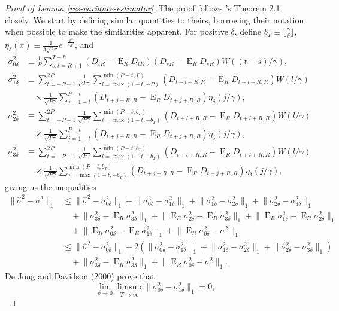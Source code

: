 \documentclass[11pt]{article}
\DeclareMathOperator{\E}{E}
\newcommand{\citepos}[1]{\citeauthor{#1}'s \citeyearpar{#1}}
\newcommand{\oosSum}[2]{\ensuremath{\sum_{#1=R+#2}^{T-\h}}}
\newcommand{\h}{h}
\newcommand{\vWeight}{W((t-s)/\gamma)}
\newcommand{\vSummand}{\ensuremath{(D_{tR} - \E_R D_{tR})(D_{sR} - \E_R D_{sR}) \vWeight}}
\newcommand{\kernelBDefn}[1]{\ensuremath{\frac1{\delta\sqrt{2\pi}}e^{-\frac{#1^2}{2\delta^2}}}}
\newcommand{\kernelB}[1]{\ensuremath{\eta_{\delta}(#1)}}
\newcommand{\vtSum}{\ensuremath{\sum_{t=-P+1}^{2P}}}
\newcommand{\vttLower}{\ensuremath{\max(1-t,-b_T)}}
\newcommand{\vttUpper}{\ensuremath{\min(P-t,b_T)}}
\newcommand{\varianceTermIDefn}{\ensuremath{\frac1{P}\oosSum{s,t}{1}
    \vSummand}}
\newcommand{\varianceTermI}{\ensuremath{\sigma_{0\delta}^2}}
\newcommand{\varianceTermII}{\ensuremath{\sigma_{1\delta}^2}}
\newcommand{\varianceTermIIa}{\ensuremath{\frac1{\sqrt{P\gamma}}
    \sum_{l=\max(1-t,-P)}^{\min(P-t,P)} (D_{t+l+R,R} - \E_R D_{t+l+R,R})
    W(l/\gamma)}}
\newcommand{\varianceTermIIb}{\ensuremath{\frac1{\sqrt{P\gamma}}
    \sum_{j=1-t}^{P-t} (D_{t+j+R,R} - \E_R D_{t+j+R,R})
    \kernelB{j/\gamma}}}
\newcommand{\varianceTermIII}{\ensuremath{\sigma_{2\delta}^{2}}}
\newcommand{\varianceTermIIIa}{\ensuremath{\frac1{\sqrt{P\gamma}}
    \sum_{l=\vttLower}^{\vttUpper} (D_{t+l+R,R} - \E_R D_{t+l+R,R})
    W(l/\gamma)}}
\newcommand{\varianceTermIV}{\ensuremath{\sigma_{3\delta}^{2}}}
\newcommand{\varianceTermIVb}{\ensuremath{\frac1{\sqrt{P\gamma}}
    \sum_{j=\vttLower}^{\vttUpper} (D_{t+j+R,R} - \E_R D_{t+j+R,R})
    \kernelB{j/\gamma}}}
\begin{document}
\begin{proof}[Proof of Lemma \ref{res-variance-estimator}]
  The proof follows \citepos{JoD:00} Theorem 2.1 closely.  We start by
  defining similar quantities to theirs, borrowing their notation when
  possible to make the similarities apparent.  For positive $\delta$,
  define $b_T \equiv \lfloor \frac\gamma\delta \rfloor$, $\kernelB{x}
  \equiv \kernelBDefn{x}$, and
\begin{align*}
  \varianceTermI &\equiv
  \varianceTermIDefn,\\ \varianceTermII &\equiv \vtSum
  \varianceTermIIa\\& \quad \times \varianceTermIIb,\\
  \varianceTermIII &\equiv \vtSum \varianceTermIIIa\\
  &\quad \times \varianceTermIIb,\\
  \varianceTermIV &\equiv \vtSum \varianceTermIIIa \\
  &\quad\times \varianceTermIVb,
\end{align*}
giving us the inequalities
\begin{align*}
  \lVert \hat\sigma^2 - \sigma^2 \rVert_1 &
  \leq \lVert \hat\sigma^2 - \varianceTermI \rVert_1 
  + \lVert \varianceTermI - \varianceTermII \rVert_1 
  + \lVert \varianceTermII - \varianceTermIII \rVert_1 
  + \lVert \varianceTermIII - \varianceTermIV \rVert_1\\ & \quad
  + \lVert \varianceTermIV - \E_R \varianceTermIV \rVert_1 
  + \lVert \E_R\varianceTermIII - \E_R\varianceTermIV \rVert_1
  + \lVert \E_R\varianceTermII - \E_R\varianceTermIII \rVert_1\\ & \quad 
  + \lVert \E_R\varianceTermI - \E_R\varianceTermII \rVert_1 
  + \lVert \E_R \varianceTermI - \sigma^2 \rVert_1
  \\ &
  \leq  \lVert \hat\sigma^2 - \varianceTermI \rVert_1 
  + 2(\lVert \varianceTermI - \varianceTermII \rVert_1 
      + \lVert \varianceTermII - \varianceTermIII \rVert_1 
      + \lVert \varianceTermIII - \varianceTermIV \rVert_1) \\ 
  & \quad + \lVert \varianceTermIV - \E_R \varianceTermIV \rVert_1 
  + \lVert \E_R \varianceTermI - \sigma^2 \rVert_1.
\end{align*}
De Jong and Davidson (2000) prove that
\begin{equation} \label{dd1}
\lim_{\delta\to0} \limsup_{T\to\infty} \lVert \varianceTermI -
\varianceTermII\rVert_1 = 0,
\end{equation}
\begin{equation} \label{dd2}

\end{equation}
\end{proof}
\end{document}
